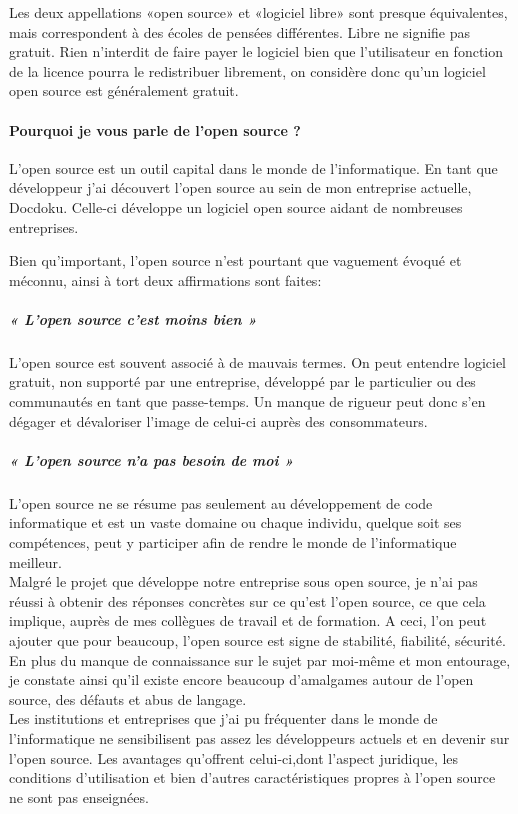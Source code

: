 			Les deux appellations «open source» et «logiciel libre» sont presque équivalentes, mais correspondent à des écoles de pensées différentes. Libre ne signifie pas gratuit.
			Rien n'interdit de faire payer le logiciel bien que l'utilisateur en fonction de la licence pourra le redistribuer librement, on considère donc qu'un logiciel open source est généralement gratuit.
				
		\paragraph{Pourquoi je vous parle de l'open source ?\\}

			L'open source est un outil capital dans le monde de l'informatique.
			En tant que développeur j'ai découvert l'open source au sein de mon entreprise actuelle, Docdoku.
			Celle-ci développe un logiciel open source aidant de nombreuses entreprises.

			Bien qu'important, l'open source n'est pourtant que vaguement évoqué et méconnu, ainsi à tort deux affirmations sont faites:
			
			\subparagraph{« L'open source c'est moins bien »\\}

				L'open source est souvent associé à de mauvais termes. On peut entendre logiciel gratuit, non supporté par une entreprise, développé par le particulier ou des communautés en tant que passe-temps. Un manque de rigueur peut donc s'en dégager et dévaloriser l'image de celui-ci auprès des consommateurs.

			\subparagraph{« L'open source n'a pas besoin de moi »\\}

				L'open source ne se résume pas seulement au développement de code informatique et est un vaste domaine ou chaque individu, quelque soit ses compétences, peut y participer afin de rendre le monde de l'informatique meilleur.\\

			Malgré le projet que développe notre entreprise sous open source, je n'ai pas réussi à obtenir des réponses concrètes sur ce qu'est l'open source, ce que cela implique, auprès de mes collègues de travail et de formation. A ceci, l'on peut ajouter que pour beaucoup, l'open source est signe de stabilité, fiabilité, sécurité.\\

			En plus du manque de connaissance sur le sujet par moi-même et mon entourage, je constate ainsi qu'il existe encore beaucoup d'amalgames autour de l'open source, des défauts et abus de langage.\\
			Les institutions et entreprises que j'ai pu fréquenter dans le monde de l'informatique ne sensibilisent pas assez les développeurs actuels et en devenir sur l'open source. Les avantages qu'offrent celui-ci,dont l'aspect juridique, les conditions d'utilisation et bien d'autres caractéristiques propres à l'open source ne sont pas enseignées.\\

